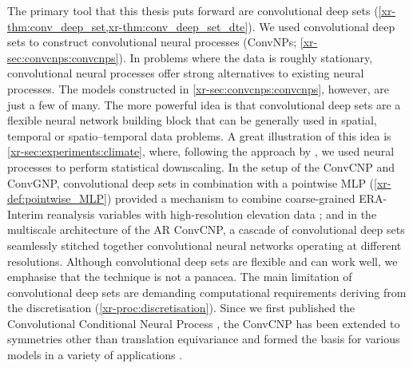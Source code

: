 \documentclass[12pt, twoside]{report}
\newcommand{\xrprefix}[1]{xr-#1}
\begin{document}
The primary tool that this thesis puts forward are convolutional deep sets (\cref{\xrprefix{thm:conv_deep_set},\xrprefix{thm:conv_deep_set_dte}}).
We used convolutional deep sets to construct convolutional neural processes (ConvNPs; \cref{\xrprefix{sec:convcnps:convcnps}}).
In problems where the data is roughly stationary, convolutional neural processes offer strong alternatives to existing neural processes.
The models constructed in \cref{\xrprefix{sec:convcnps:convcnps}}, however, are just a few of many.
The more powerful idea is that convolutional deep sets are a flexible neural network building block
that can be generally used in spatial, temporal or spatio--temporal data problems.
A great illustration of this idea is \cref{\xrprefix{sec:experiments:climate}},
where,
following the approach by \textcite{Vaughan:2022:Convolutional_Conditional_Neural_Processes_for},
we used neural processes to perform statistical downscaling.
In the setup of the ConvCNP and ConvGNP, convolutional deep sets in combination with a pointwise MLP (\cref{\xrprefix{def:pointwise_MLP}}) provided a mechanism to combine coarse-grained ERA-Interim reanalysis variables with high-resolution elevation data \parencite{Vaughan:2022:Convolutional_Conditional_Neural_Processes_for};
and in the multiscale architecture of the AR ConvCNP, a cascade of convolutional deep sets seamlessly stitched together convolutional neural networks operating at different resolutions.
Although convolutional deep sets are flexible and can work well, we emphasise that the technique is not a panacea.
The main limitation of convolutional deep sets are demanding computational requirements deriving from the discretisation (\cref{\xrprefix{proc:discretisation}}).
%
Since we first published the Convolutional Conditional Neural Process \parencite[ConvCNP;][]{Gordon:2020:Convolutional_Conditional_Neural_Processes}, the ConvCNP has been extended to symmetries other than translation equivariance \parencite{Kawano:2021:Group_Equivariant_Conditional_Neural_processes,Holderrieth:2021:Equivariant_Learning_of_Stochastic_Fields} and formed the basis for various models in a variety of applications
\parencite{
Foong:2020:Meta-Learning_Stationary_Stochastic_Process_Prediction,
Shyshya:2020:Neural_Models_for_Non-Uniformly_Samples,
Petersen:2021:GP-ConvCNP_Better_Generalization_for_Convolutional,
Wang:2021:Global_Convolutional_Neural_Processes,
Vaughan:2021:Multivariate_Climate_Downscaling_with_LNPs,
Pondaven:2022:Convolutional_Neural_Processes_for_Inpainting,
Vaughan:2022:Convolutional_Conditional_Neural_Processes_for}.
\end{document}
